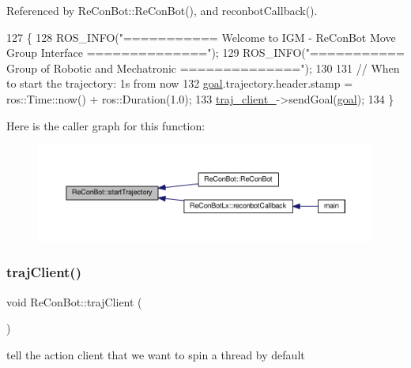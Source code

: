 Referenced by Re\+Con\+Bot\+::\+Re\+Con\+Bot(), and reconbot\+Callback().


\begin{DoxyCode}
127                                                                         \{
128   ROS\_INFO(\textcolor{stringliteral}{"=========== Welcome to IGM - ReConBot Move Group Interface =============="});
129   ROS\_INFO(\textcolor{stringliteral}{"=========== Group of Robotic and Mechatronic               =============="});
130 
131     \textcolor{comment}{// When to start the trajectory: 1s from now}
132     \hyperlink{class_re_con_bot_a9bd1c7ddf2376e2e68ea5d8bd8c3f505}{goal}.trajectory.header.stamp = ros::Time::now() + ros::Duration(1.0);
133     \hyperlink{class_re_con_bot_a14a35ad6ca284af7db7228d7872720d1}{traj\_client\_}->sendGoal(\hyperlink{class_re_con_bot_a9bd1c7ddf2376e2e68ea5d8bd8c3f505}{goal});
134   \}
\end{DoxyCode}
Here is the caller graph for this function\+:
\nopagebreak
\begin{figure}[H]
\begin{center}
\leavevmode
\includegraphics[width=350pt]{d9/d0b/class_re_con_bot_ade3eb1a4752d45659321209f5730cef3_icgraph}
\end{center}
\end{figure}
\mbox{\label{class_re_con_bot_ab859fa96532995d3c1545aaa9db1802e}} 
\subsubsection{\texorpdfstring{traj\+Client()}{trajClient()}}
{\footnotesize\ttfamily void Re\+Con\+Bot\+::traj\+Client (\begin{DoxyParamCaption}{ }\end{DoxyParamCaption})\hspace{0.3cm}{\ttfamily [inherited]}}

tell the action client that we want to spin a thread by default

